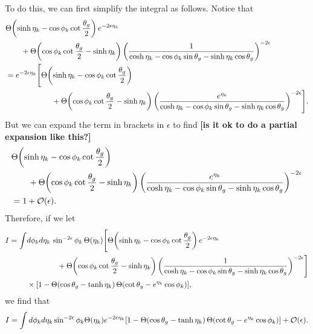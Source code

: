 \documentclass[11pt,twoside,reqno]{amsart}
\theoremstyle{plain}
\theoremstyle{remark}
\theoremstyle{definition}
\theoremstyle{remark}
\theoremstyle{definition}
\theoremstyle{definition}
\newcommand{\cO}{\mathcal{O}}
\begin{document}
	To do this, we can first simplify the integral as follows. Notice that
	\begin{equation}
	\begin{aligned}
		&\Theta\qty(\sinh\eta_k - \cos\phi_k\cot\frac{\theta_g}{2})\,e^{-2\epsilon\eta_k} \\
			&\qquad+ \Theta\qty(\cos\phi_k\cot\frac{\theta_g}{2} - \sinh\eta_k)\, \qty(\frac{1}{\cosh\eta_k - \cos\phi_k\sin\theta_g - \sinh\eta_k\cos\theta_g})^{-2\epsilon} \\
		&= e^{-2\epsilon\eta_k} \Bigg[\Theta\qty(\sinh\eta_k - \cos\phi_k\cot\frac{\theta_g}{2}) \\
			&\qquad\qquad\qquad + \Theta\qty(\cos\phi_k\cot\frac{\theta_g}{2} - \sinh\eta_k)\, \qty(\frac{e^{\eta_k}}{\cosh\eta_k - \cos\phi_k\sin\theta_g - \sinh\eta_k\cos\theta_g})^{-2\epsilon}\Bigg].
	\end{aligned}
	\end{equation}
	But we can expand the term in brackets in $\epsilon$ to find {\color{red}\textbf{[is it ok to do a partial expansion like this?]}}
	\begin{equation}
	\begin{aligned}
		&\Theta\qty(\sinh\eta_k - \cos\phi_k\cot\frac{\theta_g}{2}) \\
			&\qquad+ \Theta\qty(\cos\phi_k\cot\frac{\theta_g}{2} - \sinh\eta_k)\, \qty(\frac{e^{\eta_k}}{\cosh\eta_k - \cos\phi_k\sin\theta_g - \sinh\eta_k\cos\theta_g})^{-2\epsilon} \\
		&= 1 + \cO(\epsilon).
	\end{aligned}
	\end{equation}
	Therefore, if we let
	\begin{equation}
	\begin{aligned}
		I = \int &d\phi_k d\eta_k\, \sin^{-2\epsilon}\phi_k \, \Theta(\eta_k) \Bigg[ \Theta\qty(\sinh\eta_k - \cos\phi_k\cot\frac{\theta_g}{2})\,e^{-2\epsilon\eta_k} \\
			&\qquad\qquad+ \Theta\qty(\cos\phi_k\cot\frac{\theta_g}{2} - \sinh\eta_k)\, \qty(\frac{1}{\cosh\eta_k - \cos\phi_k\sin\theta_g - \sinh\eta_k\cos\theta_g})^{-2\epsilon}\Bigg] \\
			&\times \qty[1 - \Theta(\cos\theta_g - \tanh\eta_k)\,\Theta\qty(\cot\theta_g - e^{\eta_k}\cos\phi_k)],
	\end{aligned}
	\end{equation}
	we find that
	\begin{equation}
		I = \int d\phi_k d\eta_k \sin^{-2\epsilon}\phi_k \Theta(\eta_k) e^{-2\epsilon\eta_k} \qty[1 - \Theta(\cos\theta_g - \tanh\eta_k)\,\Theta\qty(\cot\theta_g - e^{\eta_k}\cos\phi_k)] + \cO(\epsilon).
	\end{equation}
\end{document}
